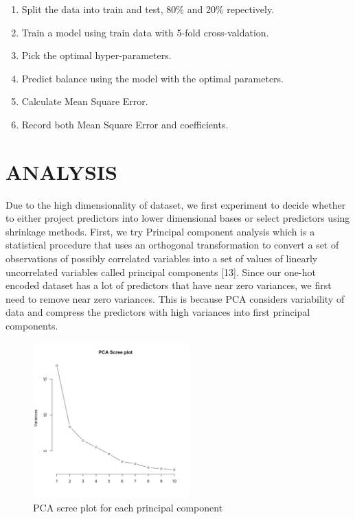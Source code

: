 \documentclass[letterpaper, 10 pt, conference]{ieeeconf}\usepackage[]{graphicx}\usepackage[]{color}
\begin{document}
\begin{enumerate}
\item Split the data into train and test, 80\% and 20\% repectively.
\item Train a model using train data with 5-fold cross-valdation.
\item Pick the optimal hyper-parameters.
\item Predict balance using the model with the optimal parameters.
\item Calculate Mean Square Error.
\item Record both Mean Square Error and coefficients.
\end{enumerate}

\section{ANALYSIS}
Due to the high dimensionality of dataset, we first experiment to decide whether to either project predictors into lower dimensional bases or select predictors using shrinkage methods. First, we try Principal component analysis which is a statistical procedure that uses an orthogonal transformation to convert a set of observations of possibly correlated variables into a set of values of linearly uncorrelated variables called principal components [13]. Since our one-hot encoded dataset has a lot of predictors that have near zero variances, we first need to remove near zero variances. This is because PCA considers variability of data and compress the predictors with high variances into first principal components.   

   \begin{figure}[thpb]
      \centering
      \includegraphics[width =  6cm, height = 6cm]{../images/model_pca_scree_plot.png}
      \caption{PCA scree plot for each principal component}
      \label{figurelabel}
   \end{figure}
\end{document}
